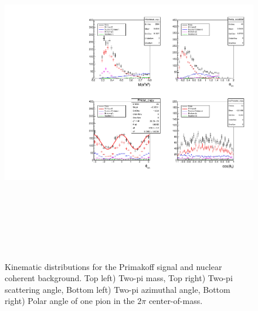  \begin{figure}[tbp]
\begin{center}
\includegraphics[height=15cm,clip=true]{figures/twopi_primakoff_DSelect_test_File_100000_decomposition_PrimNCICeta.pdf}
\caption{Kinematic distributions for the Primakoff signal and nuclear coherent background.
Top left) Two-pi mass, Top right) Two-pi scattering angle, Bottom left) Two-pi azimuthal angle, 
Bottom right) Polar angle of one pion in the $2\pi$ center-of-mass.
\label{fig:decomposition_PrimNCICeta}}
\end{center} 
\end{figure}

